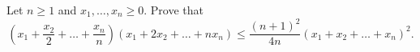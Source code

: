 Let $n \ge 1$ and $x_1, \ldots, x_n \ge 0$.
Prove that \[
	\left(x_1 + \frac{x_2}{2} + \ldots + \frac{x_n}{n}\right) \left(x_1 + 2x_2 + \ldots + nx_n\right) \le \frac{(n+1)^2}{4n} \left(x_1 + x_2 + \ldots + x_n\right)^2 .
\]
